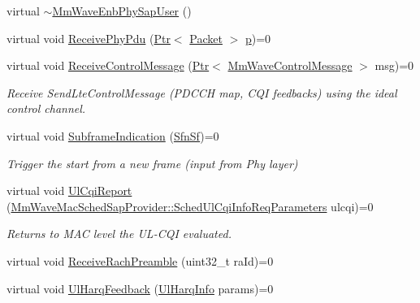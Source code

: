 \begin{DoxyCompactItemize}
\item 
virtual \hyperlink{classns3_1_1MmWaveEnbPhySapUser_a572857f6e512cf4f750d37dfb3fb4b42}{$\sim$\+Mm\+Wave\+Enb\+Phy\+Sap\+User} ()
\item 
virtual void \hyperlink{classns3_1_1MmWaveEnbPhySapUser_a1380606c33c375d4f208061e0363d876}{Receive\+Phy\+Pdu} (\hyperlink{classns3_1_1Ptr}{Ptr}$<$ \hyperlink{classns3_1_1Packet}{Packet} $>$ \hyperlink{lte__link__budget__x2__handover__measures_8m_ac9de518908a968428863f829398a4e62}{p})=0
\item 
virtual void \hyperlink{classns3_1_1MmWaveEnbPhySapUser_af9ec7de3885e371f394e017f4855996f}{Receive\+Control\+Message} (\hyperlink{classns3_1_1Ptr}{Ptr}$<$ \hyperlink{classns3_1_1MmWaveControlMessage}{Mm\+Wave\+Control\+Message} $>$ msg)=0
\begin{DoxyCompactList}\small\item\em Receive Send\+Lte\+Control\+Message (P\+D\+C\+CH map, C\+QI feedbacks) using the ideal control channel. \end{DoxyCompactList}\item 
virtual void \hyperlink{classns3_1_1MmWaveEnbPhySapUser_a233023a30b3f41bc54347d3bdce1ff05}{Subframe\+Indication} (\hyperlink{structns3_1_1SfnSf}{Sfn\+Sf})=0
\begin{DoxyCompactList}\small\item\em Trigger the start from a new frame (input from Phy layer) \end{DoxyCompactList}\item 
virtual void \hyperlink{classns3_1_1MmWaveEnbPhySapUser_ad642f5ef9b88c4741c5d43107adb8b5d}{Ul\+Cqi\+Report} (\hyperlink{structns3_1_1MmWaveMacSchedSapProvider_1_1SchedUlCqiInfoReqParameters}{Mm\+Wave\+Mac\+Sched\+Sap\+Provider\+::\+Sched\+Ul\+Cqi\+Info\+Req\+Parameters} ulcqi)=0
\begin{DoxyCompactList}\small\item\em Returns to M\+AC level the U\+L-\/\+C\+QI evaluated. \end{DoxyCompactList}\item 
virtual void \hyperlink{classns3_1_1MmWaveEnbPhySapUser_aa7d2dc521d374880e73560a10797978b}{Receive\+Rach\+Preamble} (uint32\+\_\+t ra\+Id)=0
\item 
virtual void \hyperlink{classns3_1_1MmWaveEnbPhySapUser_a260878e10f22889f4fbea4fb6210e402}{Ul\+Harq\+Feedback} (\hyperlink{structns3_1_1UlHarqInfo}{Ul\+Harq\+Info} params)=0
\end{DoxyCompactItemize}


